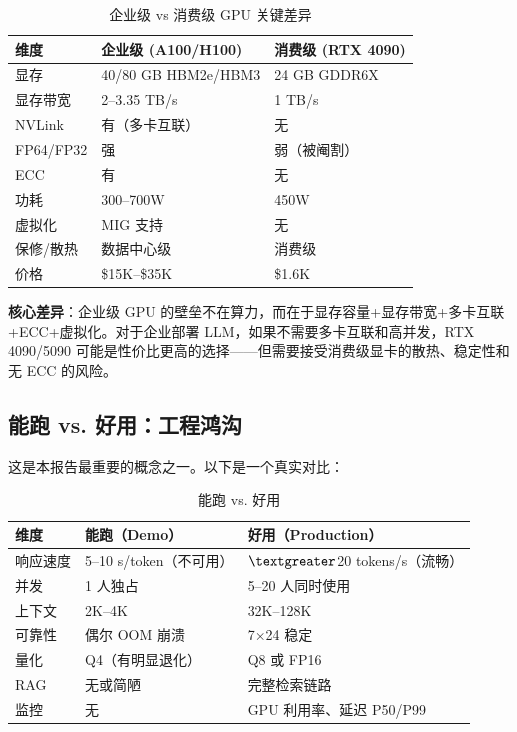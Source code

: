 \documentclass[UTF8,a4paper,10pt,oneside]{ctexart}
\begin{document}
\begin{table}[htbp]
\centering
\caption{企业级 vs 消费级 GPU 关键差异}
\begin{tabular}{p{2cm}p{5.5cm}p{3.5cm}}
\hline
\textbf{维度} & \textbf{企业级 (A100/H100)} & \textbf{消费级 (RTX 4090)} \\
\hline
显存 & 40/80 GB HBM2e/HBM3 & 24 GB GDDR6X \\
显存带宽 & 2--3.35 TB/s & 1 TB/s \\
NVLink & 有（多卡互联） & 无 \\
FP64/FP32 & 强 & 弱（被阉割） \\
ECC & 有 & 无 \\
功耗 & 300--700W & 450W \\
虚拟化 & MIG 支持 & 无 \\
保修/散热 & 数据中心级 & 消费级 \\
价格 & \$15K--\$35K & \$1.6K \\
\hline
\end{tabular}
\end{table}

\textbf{核心差异}：企业级 GPU 的壁垒不在算力，而在于显存容量+显存带宽+多卡互联+ECC+虚拟化。对于企业部署 LLM，如果不需要多卡互联和高并发，RTX 4090/5090 可能是性价比更高的选择——但需要接受消费级显卡的散热、稳定性和无 ECC 的风险。

\subsection{能跑 vs. 好用：工程鸿沟}

这是本报告最重要的概念之一。以下是一个真实对比：

\begin{table}[htbp]
\centering
\caption{能跑 vs. 好用}
\begin{tabular}{p{2cm}p{4cm}p{5cm}}
\hline
\textbf{维度} & \textbf{能跑（Demo）} & \textbf{好用（Production）} \\
\hline
响应速度 & 5--10 s/token（不可用）& $\textgreater$20 tokens/s（流畅）\\
并发 & 1 人独占 & 5--20 人同时使用 \\
上下文 & 2K--4K & 32K--128K \\
可靠性 & 偶尔 OOM 崩溃 & 7$\times$24 稳定 \\
量化 & Q4（有明显退化）& Q8 或 FP16 \\
RAG & 无或简陋 & 完整检索链路 \\
监控 & 无 & GPU 利用率、延迟 P50/P99 \\
\hline
\end{tabular}
\end{table}
\end{document}

